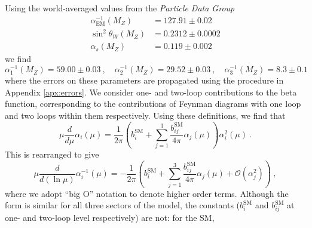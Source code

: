 \documentclass[12pt,a4paper,oneside]{article}
\begin{document}
Using the world-averaged values from the \textit{Particle Data Group} \cite{pdg} 
\begin{align}
\alpha_\mathrm{EM}^{-1} (M_Z) &= 127.91 \pm 0.02 \nonumber \\
\sin^2 \theta_W (M_Z) &= 0.2312 \pm 0.0002 \label{eqn:world-vals} \\
\alpha_s (M_Z) &= 0.119 \pm 0.002 \nonumber
\end{align}
we find
\begin{equation}
\alpha_1^{-1} (M_Z) = 59.00 \pm 0.03 \:, \quad
\alpha_2^{-1} (M_Z) =  29.52 \pm 0.03 \:, \quad
\alpha_3^{-1} (M_Z) =  8.3 \pm 0.1
\label{eqn:couplingvals}
\end{equation}
where the errors on these parameters are propagated using the procedure in Appendix \ref{apx:errors}. 
We consider one- and two-loop contributions to the beta function, corresponding to the contributions of Feynman diagrams with one loop and two loops within them respectively. Using these definitions, we find that \cite{amaldi}
\[
\mu \dfrac{d}{d \mu} \alpha_i (\mu) = \dfrac{1}{2 \pi} \left( b^\mathrm{SM}_i + \sum_{j=1}^{3} \dfrac{b^\mathrm{SM}_{i j}}{4 \pi} \alpha_j (\mu) \right) \alpha_i^2 (\mu) \:.
\]
This is rearranged to give
\begin{equation}
\mu \dfrac{d}{d (\ln \mu)} \alpha_i^{-1} (\mu) = -\dfrac{1}{2 \pi} \left( b^\mathrm{SM}_i + \sum_{j=1}^{3} \dfrac{b^\mathrm{SM}_{i j}}{4 \pi} \alpha_j (\mu) + \mathcal{O}(\alpha_j^2) \right) \:,
\label{eqn:sm-beta}
\end{equation}
where we adopt ``big O'' notation to denote higher order terms. Although the form is similar for all three sectors of the model, the constants ($b^\mathrm{SM}_i$ and $b^\mathrm{SM}_{ij}$ at one- and two-loop level respectively) are not: for the SM\cite{b},
\singlespace %
\end{document}
